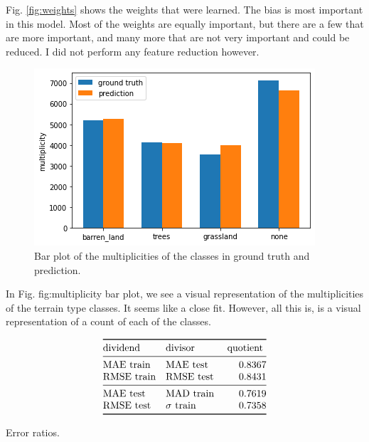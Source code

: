 \documentclass[11pt]{report}
\begin{document}
Fig. \ref{fig:weights} shows the weights that were learned.
The bias is most important in this model.
Most of the weights are equally important,
but there are a few that are more important,
and many more that are not very important and could be reduced.
I did not perform any feature reduction however.

\begin{figure}
    \centering
    \includegraphics[width=0.75\linewidth]{ipynb/output_52_1.png}
    \caption{Bar plot of the multiplicities of the classes in ground truth and prediction.}
    \label{fig:multiplicity bar plot}
\end{figure}

In Fig. {fig:multiplicity bar plot}, we see a visual representation of the multiplicities of the terrain type classes.
It seems like a close fit.
However, all this is, is a visual representation of a count of each of the classes.

\begin{table}[]
    \centering
    \[
        \begin{array}{@{}llS[round-mode=figures,round-precision=4]@{}}
        \toprule
            \text{dividend} & \text{divisor} & \text{quotient}
        \\*
        \midrule
            \text{MAE train} & \text{MAE test}
            & 0.836726
        \\*
            \text{RMSE train} & \text{RMSE test}
            & 0.843065
        \\*
        \midrule
            \text{MAE test} & \text{MAD train}
            & 0.761874
        \\*
            \text{RMSE test} & \text{\(\sigma\) train}
            & 0.735807
        \\*
        \bottomrule
        \end{array}
    \]
    \caption{Error ratios.}
    \label{tab:error ratios}
\end{table}
\end{document}
